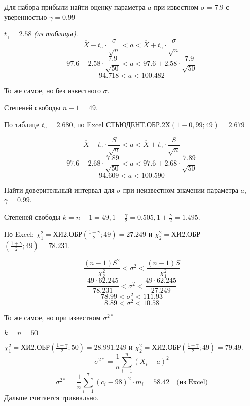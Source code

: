 

\cfoot{}



\begin{exercise}
    Для набора прибыли найти оценку параметра \(a\) при известном \(\sigma = 7.9\) с уверенностью \(\gamma = 0.99\)
\end{exercise}
\begin{solution}
    \(t_\gamma = 2.58\) \textit{(из таблицы)}.
    \[\overline{X} - t_\gamma \cdot \frac{\sigma}{\sqrt{n}} < a < \overline{X} + t_\gamma \cdot \frac{\sigma}{\sqrt{n}}\]
    \[97.6 - 2.58 \cdot \frac{7.9}{\sqrt{50}} < a < 97.6 + 2.58 \cdot \frac{7.9}{\sqrt{50}}\]
    \[94.718 < a < 100.482\]
\end{solution}

\begin{exercise}
    То же самое, но без известного \(\sigma\).
\end{exercise}
\begin{solution}
    Степеней свободы \(n - 1 = 49\).

    По таблице \(t_\gamma = 2.680\), по Excel СТЬЮДЕНТ.ОБР.2Х\((1-0,99;  49) = 2.679\)

    \[\overline{X} - t_\gamma \cdot \frac{S}{\sqrt{n}} < a < \overline{X} + t_\gamma \cdot \frac{S}{\sqrt{n}}\]
    \[97.6 - 2.68 \cdot \frac{7.89}{\sqrt{50}} < a < 97.6 + 2.68 \cdot \frac{7.89}{\sqrt{50}}\]
    \[94.609 < a < 100.590\]
\end{solution}

\begin{exercise}
    Найти доверительный интервал для \(\sigma\) при неизвестном значении параметра \(a\), \(\gamma = 0.99\).
\end{exercise}
\begin{solution}
    Степеней свободы \(k = n - 1 = 49, 1 - \frac{\gamma}{2} = 0.505, 1 + \frac{\gamma}{2} = 1.495\).

    По Excel: \(\chi_1^2 =\)ХИ2.ОБР\(\left(\frac{1 - \gamma}{2}; 49\right) = 27.249\) и \(\chi_2^2 =\)ХИ2.ОБР\(\left(\frac{1 + \gamma}{2}; 49\right) = 78.231\).

    \[\frac{(n - 1)S^2}{\chi_2^2} < \sigma^2 < \frac{(n - 1)S}{\chi_1^2}\]
    \[\frac{49 \cdot 62.245}{78.231} < \sigma^2 < \frac{49 \cdot 62.245}{27.249}\]
    \[78.99 < \sigma^2 < 111.93\]
    \[8.89 < \sigma^2 < 10.58\]
\end{solution}

\begin{exercise}
    То же самое, но при известном \(\sigma^{2*}\)
\end{exercise}
\begin{solution}
    \(k = n = 50\)

    \(\chi_1^2 =\)ХИ2.ОБР\(\left(\frac{1 - \gamma}{2}; 50\right) = 28.991.249\) и \(\chi_2^2 =\)ХИ2.ОБР\(\left(\frac{1 + \gamma}{2}; 49\right) = 79.49\).
    \[\sigma^{2*} = \frac{1}{n} \sum_{i=1}^{n} (X_i - a)^2\]
    \[\sigma^{2*} = \frac{1}{n} \sum_{i=1}^{7} (c_i - 98)^2 \cdot m_i = 58.42 \quad \text{(из Excel)}\]
    Дальше считается тривиально.
\end{solution}


